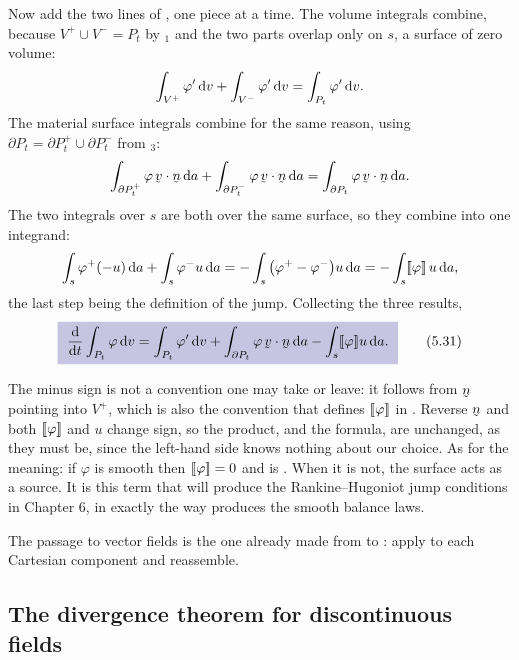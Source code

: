 Now add the two lines of , one piece at a time. The volume
integrals combine, because $V^{+}\cup V^{-}=P_{t}$ by $_{1}$ and
the two parts overlap only on $s$, a surface of zero volume:
\[
   \int_{V^{+}}\varphi'\,\mathrm{d} v+\int_{V^{-}}\varphi'\,\mathrm{d} v
   =\int_{P_{t}}\varphi'\,\mathrm{d} v .
\]
The material surface integrals combine for the same reason, using
$\partial P_{t}=\partial P^{+}_{t}\cup\partial P^{-}_{t}$ from
$_{3}$:
\[
   \int_{\partial P^{+}_{t}}\varphi\,\ip\bv\bn\,\dl a
   +\int_{\partial P^{-}_{t}}\varphi\,\ip\bv\bn\,\dl a
   =\int_{\partial P_{t}}\varphi\,\ip\bv\bn\,\dl a .
\]
The two integrals over $s$ are both over the same surface, so they combine
into one integrand:
\[
   \int_{s}\varphi^{+}(-u)\,\mathrm{d} a+\int_{s}\varphi^{-}u\,\mathrm{d} a
   =-\int_{s}\big(\varphi^{+}-\varphi^{-}\big)u\,\mathrm{d} a
   =-\int_{s}[\![\varphi]\!]\,u\,\mathrm{d} a ,
\]
the last step being the definition  of the jump. Collecting the
three results,
\begin{equation}
   \boxed{\ \frac{\dl}{\dl t}\int_{P_{t}}\varphi\,\dl v
   =\int_{P_{t}}\varphi'\,\dl v
   +\int_{\partial P_{t}}\varphi\,\ip\bv\bn\,\dl a
   -\int_{s}\jump{\varphi}u\,\dl a .\ }
   \tag{5.31}\label{eq:5.31}
\end{equation}

\begin{remark}\label{rem:jumpsign}
The minus sign is not a convention one may take or leave: it follows from
$\bn$ pointing into $V^{+}$, which is also the convention that defines
$[\![\varphi]\!]$ in . Reverse $\bn$ and both $[\![\varphi]\!]$ and
$u$ change sign, so the product, and the formula, are unchanged, as they must be, since the left-hand side knows nothing
about our choice. As for the
meaning: if $\varphi$ is smooth then $[\![\varphi]\!]=0$ and  is
. When it is not, the surface acts as a source. It is this term
that will produce the Rankine--Hugoniot jump conditions in Chapter 6, in
exactly the way  produces the smooth balance laws.
\end{remark}

The passage to vector fields is the one already made from  to
: apply  to each Cartesian component and reassemble.

\subsection{The divergence theorem for discontinuous fields}
\label{sec:divdisc}

